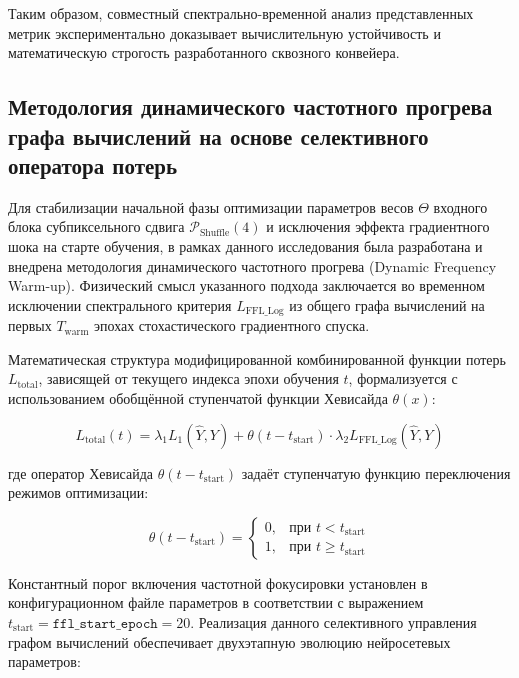 \documentclass[12pt,a4paper]{article}
\begin{document}
Таким образом, совместный спектрально-временной анализ представленных метрик экспериментально доказывает вычислительную устойчивость и математическую строгость разработанного сквозного конвейера.

\subsection{Методология динамического частотного прогрева графа вычислений на основе селективного оператора потерь}

Для стабилизации начальной фазы оптимизации параметров весов $\Theta$ входного блока субпиксельного сдвига $\mathcal{P}_{\text{Shuffle}}(4)$ и исключения эффекта градиентного шока на старте обучения, в рамках данного исследования была разработана и внедрена методология динамического частотного прогрева (Dynamic Frequency Warm-up). Физический смысл указанного подхода заключается во временном исключении спектрального критерия $L_{\text{FFL\_Log}}$ из общего графа вычислений на первых $T_{\text{warm}}$ эпохах стохастического градиентного спуска.

Математическая структура модифицированной комбинированной функции потерь $L_{\text{total}}$, зависящей от текущего индекса эпохи обучения $t$, формализуется с использованием обобщённой ступенчатой функции Хевисайда $\theta(x)$:

\begin{equation}
L_{\text{total}}(t) = \lambda_{1} L_1(\hat{Y}, Y) + \theta(t - t_{\text{start}}) \cdot \lambda_{2} L_{\text{FFL\_Log}}(\hat{Y}, Y)
\end{equation}

где оператор Хевисайда $\theta(t - t_{\text{start}})$ задаёт ступенчатую функцию переключения режимов оптимизации:

\begin{equation}
\theta(t - t_{\text{start}}) = \begin{cases} 
0, & \text{при } t < t_{\text{start}} \\ 
1, & \text{при } t \ge t_{\text{start}} 
\end{cases}
\end{equation}

Константный порог включения частотной фокусировки установлен в конфигурационном файле параметров в соответствии с выражением $t_{\text{start}} = \texttt{ffl\_start\_epoch} = 20$. Реализация данного селективного управления графом вычислений обеспечивает двухэтапную эволюцию нейросетевых параметров:
\end{document}
